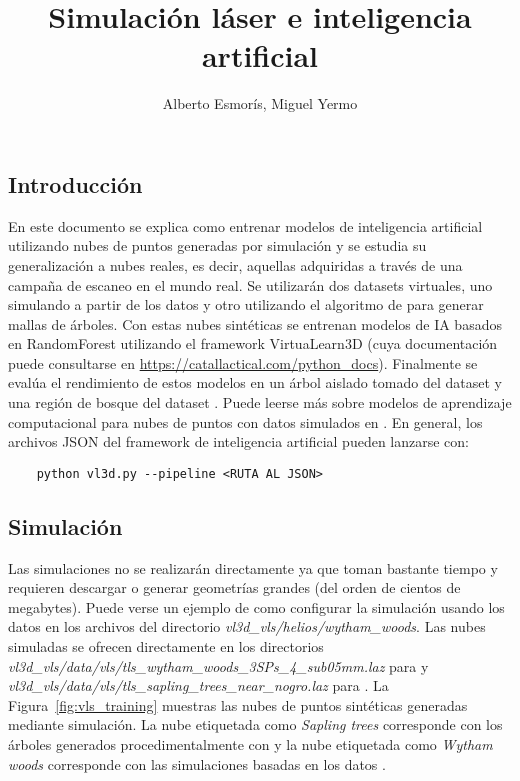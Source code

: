 \documentclass[]{article}
\title{Simulación láser e inteligencia artificial}
\author{Alberto Esmorís, Miguel Yermo}
\date{}
\begin{document}
	
	\maketitle
	
	
	
	\subsection*{Introducción}
	En este documento se explica como entrenar modelos de inteligencia artificial utilizando nubes de puntos generadas por simulación y se estudia su generalización a nubes reales, es decir, aquellas adquiridas a través de una campaña de escaneo en el mundo real. Se utilizarán dos datasets virtuales, uno simulando a partir de los datos \cite{wytham_woods} y otro utilizando el algoritmo de \cite{proc_trees} para generar mallas de árboles. Con estas nubes sintéticas se entrenan modelos de IA basados en RandomForest utilizando el framework VirtuaLearn3D (cuya documentación puede consultarse en \url{https://catallactical.com/python_docs}). Finalmente se evalúa el rendimiento de estos modelos en un árbol aislado tomado del dataset \cite{weiser_dataset} y una región de bosque del dataset \cite{wang_dataset}. Puede leerse más sobre modelos de aprendizaje computacional para nubes de puntos con datos simulados en \cite{vlsdl}. En general, los archivos JSON del framework de inteligencia artificial pueden lanzarse con:
	
	\begin{verbatim}	
	python vl3d.py --pipeline <RUTA AL JSON>
	\end{verbatim}
	
	
	\subsection*{Simulación}
	Las simulaciones no se realizarán directamente ya que toman bastante tiempo y requieren descargar o generar geometrías grandes (del orden de cientos de megabytes). Puede verse un ejemplo de como configurar la simulación usando los datos \cite{wytham_woods} en los archivos del directorio \textit{vl3d\_vls/helios/wytham\_woods}. Las nubes simuladas se ofrecen directamente en los directorios  \mbox{\textit{vl3d\_vls/data/vls/tls\_wytham\_woods\_3SPs\_4\_sub05mm.laz}} para \cite{wytham_woods} y \hfill \\ \mbox{\textit{vl3d\_vls/data/vls/tls\_sapling\_trees\_near\_nogro.laz}} para \cite{proc_trees}. La Figura~\ref{fig:vls_training} muestras las nubes de puntos sintéticas generadas mediante simulación. La nube etiquetada como \textit{Sapling trees} corresponde con los árboles generados procedimentalmente con \cite{proc_trees} y la nube etiquetada como \textit{Wytham woods} corresponde con las simulaciones basadas en los datos \cite{wytham_woods}.
	
\end{document}
